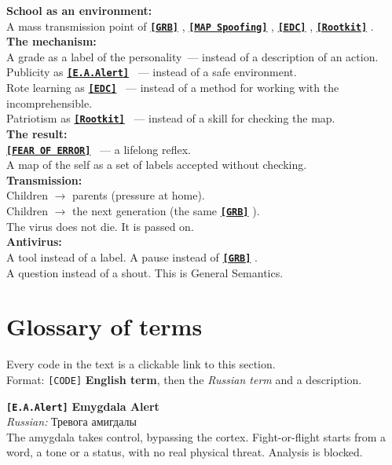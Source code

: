 \documentclass[13pt,a4paper]{article}
\newcommand{\termr}[1]{%
  \hyperref[glossary:#1]{\textbf{\texttt{\textcolor{sce-blue}{[#1]}}}}%
}
\newcommand{\termdef}[1]{\phantomsection\label{glossary:#1}}
\newenvironment{warnbox}[1]{%
  \vspace{0.9em}
  \begin{mdframed}[
    linecolor=sce-red, linewidth=4pt,
    topline=false, rightline=false, bottomline=false,
    backgroundcolor=bg-red,
    innerleftmargin=12pt, innerrightmargin=10pt,
    innertopmargin=8pt, innerbottommargin=8pt,
    skipabove=0pt, skipbelow=0pt
  ]
  \noindent{\montserrat\normalsize\bfseries\color{sce-red}#1}\par\vspace{4pt}%
  \ignorespaces
}{%
  \end{mdframed}
  \vspace{0.6em}
}
\begin{document}
\begin{warnbox}{The summary map}
\textbf{School as an environment:}\\
A mass transmission point of \termr{GRB}, \termr{MAP Spoofing}, \termr{EDC}, \termr{Rootkit}.\\[0.3em]
\textbf{The mechanism:}\\
A grade as a label of the personality~--- instead of a description of an action.\\
Publicity as \termr{E.A.Alert}~--- instead of a safe environment.\\
Rote learning as \termr{EDC}~--- instead of a method for working with the incomprehensible.\\
Patriotism as \termr{Rootkit}~--- instead of a skill for checking the map.\\[0.3em]
\textbf{The result:}\\
\termr{FEAR OF ERROR}~--- a lifelong reflex.\\
A map of the self as a set of labels accepted without checking.\\[0.3em]
\textbf{Transmission:}\\
Children $\to$ parents (pressure at home).\\
Children $\to$ the next generation (the same \termr{GRB}).\\
The virus does not die. It is passed on.\\[0.3em]
\textbf{Antivirus:}\\
A tool instead of a label. A pause instead of \termr{GRB}.\\
A question instead of a shout. This is General Semantics.
\end{warnbox}

\newpage
\section*{Glossary of terms}

Every code in the text is a clickable link to this section.\\
Format: \texttt{[CODE]} \textbf{English term}, then the \textit{Russian term} and a description.

\vspace{0.6em}

\termdef{E.A.Alert}
\noindent\textbf{\texttt{[E.A.Alert]}} \quad \textbf{Emygdala Alert}\\
\textit{Russian:} Тревога амигдалы\\
The amygdala takes control, bypassing the cortex. Fight-or-flight starts from a word, a tone or a status, with no real physical threat. Analysis is blocked.
\end{document}
